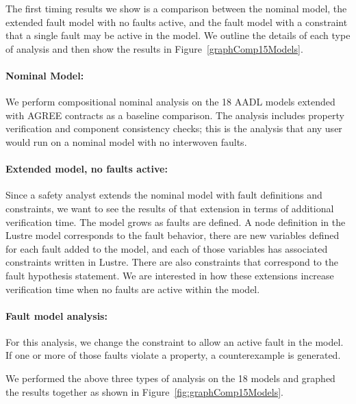 The first timing results we show is a comparison between the nominal model, the extended fault model with no faults active, and the fault model with a constraint that a single fault may be active in the model. We outline the details of each type of analysis and then show the results in Figure~\ref{graphComp15Models}.

\paragraph{Nominal Model:} We perform compositional nominal analysis on the 18 AADL models extended with AGREE contracts as a baseline comparison. The analysis includes property verification and component consistency checks; this is the analysis that any user would run on a nominal model with no interwoven faults. 

\paragraph{Extended model, no faults active:} Since a safety analyst extends the nominal model with fault definitions and constraints, we want to see the results of that extension in terms of additional verification time. The model grows as faults are defined. A node definition in the Lustre model corresponds to the fault behavior, there are new variables defined for each fault added to the model, and each of those variables has associated constraints written in Lustre. There are also constraints that correspond to the fault hypothesis statement. We are interested in how these extensions increase verification time when no faults are active within the model. 

\paragraph{Fault model analysis:} For this analysis, we change the constraint to allow an active fault in the model. If one or more of those faults violate a property, a counterexample is generated.

We performed the above three types of analysis on the 18 models and graphed the results together as shown in Figure~\ref{fig:graphComp15Models}. 

